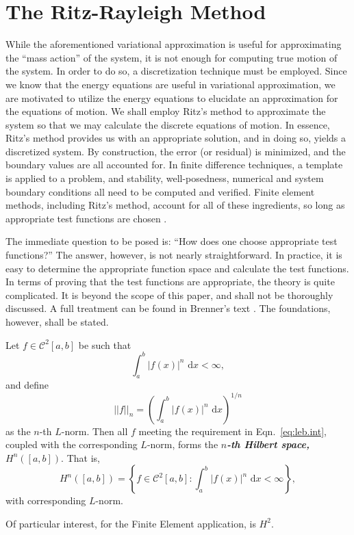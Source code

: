 \section{The Ritz-Rayleigh Method}
While the aforementioned variational approximation is useful for approximating the ``mass action'' of the system, it is not enough for computing true motion of the system. In order to do so, a discretization technique must be employed. Since we know that the energy equations are useful in variational approximation, we are motivated to utilize the energy equations to elucidate an approximation for the equations of motion. We shall employ Ritz's method to approximate the system so that we may calculate the discrete equations of motion. In essence, Ritz's method provides us with an appropriate solution, and in doing so, yields a discretized system. By construction, the error (or residual) is minimized, and the boundary values are all accounted for. In finite difference techniques, a template is applied to a problem, and stability, well-posedness, numerical and system boundary conditions all need to be computed and verified. Finite element methods, including Ritz's method, account for all of these ingredients, so long as appropriate test functions are chosen \cite{axelsson1984finite}.

The immediate question to be posed is: ``How does one choose appropriate test functions?'' The answer, however, is not nearly straightforward. In practice, it is easy to determine the appropriate function space and calculate the test functions. In terms of proving that the test functions are appropriate, the theory is quite complicated. It is beyond the scope of this paper, and shall not be thoroughly discussed. A full treatment can be found in Brenner's text \cite{brenner2008mathematical}. The foundations, however, shall be stated.

\begin{definition}
Let $f\in\mathcal C^2[a,b]$ be such that
\begin{equation}
\int_a^b\left|f(x)\right|^n\text{ d}x<\infty,
\label{eq:leb.int}
\end{equation}
and define
\begin{equation}
||f||_{n} = \left(\int_a^b\left|f(x)\right|^n\text{ d}x\right)^{1/n}
\end{equation}
as the $n$-th $L$-norm. Then all $f$ meeting the requirement in Eqn.~\ref{eq:leb.int}, coupled with the corresponding $L$-norm, forms the \emph{\textbf{$n$-th Hilbert space, $H^n([a,b])$}}. That is, 
\begin{equation}
H^n([a,b]) = \left\{f\in\mathcal C^2[a,b]:\int_a^b\left|f(x)\right|^n\text{ d}x<\infty\right\},
\end{equation}
with corresponding $L$-norm. 
\end{definition}
Of particular interest, for the Finite Element application, is $H^2$.


